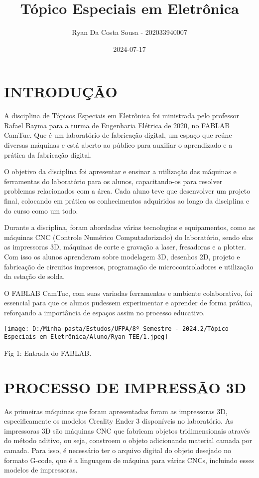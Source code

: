 \documentclass[
]{book}
\title{Tópico Especiais em Eletrônica}
\author{Ryan Da Costa Sousa - 202033940007}
\date{2024-07-17}
\begin{document}
\maketitle

{
\setcounter{tocdepth}{1}
\tableofcontents
}
\chapter{INTRODUÇÃO}\label{introduuxe7uxe3o}

A disciplina de Tópicos Especiais em Eletrônica foi ministrada pelo professor Rafael Bayma para a turma de Engenharia Elétrica de 2020, no FABLAB CamTuc. Que é um laboratório de fabricação digital, um espaço que reúne diversas máquinas e está aberto ao público para auxiliar o aprendizado e a prática da fabricação digital.

O objetivo da disciplina foi apresentar e ensinar a utilização das máquinas e ferramentas do laboratório para os alunos, capacitando-os para resolver problemas relacionados com a área. Cada aluno teve que desenvolver um projeto final, colocando em prática os conhecimentos adquiridos ao longo da disciplina e do curso como um todo.

Durante a disciplina, foram abordadas várias tecnologias e equipamentos, como as máquinas CNC (Controle Numérico Computadorizado) do laboratório, sendo elas as impressoras 3D, máquinas de corte e gravação a laser, fresadoras e a plotter. Com isso os alunos aprenderam sobre modelagem 3D, desenhos 2D, projeto e fabricação de circuitos impressos, programação de microcontroladores e utilização da estação de solda.

O FABLAB CamTuc, com suas variadas ferramentas e ambiente colaborativo, foi essencial para que os alunos pudessem experimentar e aprender de forma prática, reforçando a importância de espaços assim no processo educativo.

\texttt{[image: D:/Minha pasta/Estudos/UFPA/8º Semestre - 2024.2/Tópico Especiais em Eletrônica/Aluno/Ryan TEE/1.jpeg]}

Fig 1: Entrada do FABLAB.

\chapter{PROCESSO DE IMPRESSÃO 3D}\label{processo-de-impressuxe3o-3d}

As primeiras máquinas que foram apresentadas foram as impressoras 3D, especificamente os modelos Creality Ender 3 disponíveis no laboratório. As impressoras 3D são máquinas CNC que fabricam objetos tridimensionais através do método aditivo, ou seja, constroem o objeto adicionando material camada por camada. Para isso, é necessário ter o arquivo digital do objeto desejado no formato G-code, que é a linguagem de máquina para várias CNCs, incluindo esses modelos de impressoras.
\end{document}
